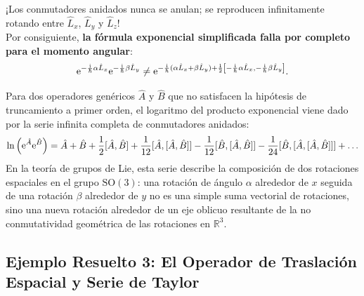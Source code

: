 \begin{alertabox}
\begin{itemize}
\begin{equation}
        \end{equation}
        ¡Los conmutadores anidados nunca se anulan; se reproducen infinitamente rotando entre $\hat{L}_x$, $\hat{L}_y$ y $\hat{L}_z$!\\
        Por consiguiente, \textbf{la fórmula exponencial simplificada falla por completo para el momento angular}:
        \begin{equation}
            \mathrm{e}^{-\frac{\mathrm{i}}{\hbar}\alpha\hat{L}_x}\mathrm{e}^{-\frac{\mathrm{i}}{\hbar}\beta\hat{L}_y} \neq \mathrm{e}^{-\frac{\mathrm{i}}{\hbar}(\alpha\hat{L}_x + \beta\hat{L}_y) + \frac{1}{2}\left[-\frac{\mathrm{i}}{\hbar}\alpha\hat{L}_x, -\frac{\mathrm{i}}{\hbar}\beta\hat{L}_y\right]}.
            \label{eq:bch_falla_L}
        \end{equation}
    \end{itemize}
\end{alertabox}

\begin{teoremabox}
    Para dos operadores genéricos $\hat{A}$ y $\hat{B}$ que no satisfacen la hipótesis de truncamiento a primer orden, el logaritmo del producto exponencial viene dado por la serie infinita completa de conmutadores anidados:
    \begin{equation}
        \ln\left( \eu^{\hat{A}}\eu^{\hat{B}} \right) = \hat{A} + \hat{B} + \frac{1}{2}[\hat{A}, \hat{B}] + \frac{1}{12}[\hat{A}, [\hat{A}, \hat{B}]] - \frac{1}{12}[\hat{B}, [\hat{A}, \hat{B}]] - \frac{1}{24}[\hat{B}, [\hat{A}, [\hat{A}, \hat{B}]]] + \dots
        \label{eq:bch_general_series}
    \end{equation}
    En la teoría de grupos de Lie, esta serie describe la composición de dos rotaciones espaciales en el grupo $\mathrm{SO}(3)$: una rotación de ángulo $\alpha$ alrededor de $x$ seguida de una rotación $\beta$ alrededor de $y$ no es una simple suma vectorial de rotaciones, sino una nueva rotación alrededor de un eje oblicuo resultante de la no conmutatividad geométrica de las rotaciones en $\mathbb{R}^3$.
\end{teoremabox}



\subsection{Ejemplo Resuelto 3: El Operador de Traslación Espacial y Serie de Taylor}

